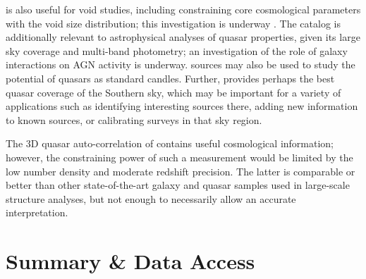 \cat is also useful for void studies, including constraining core cosmological parameters with the void size distribution; this investigation is underway \citep{quaia-voids}.
The catalog is additionally relevant to astrophysical analyses of quasar properties, given its large sky coverage and multi-band photometry; an investigation of the role of galaxy interactions on AGN activity is underway.
\cat sources may also be used to study the potential of quasars as standard candles.
Further, \cat provides perhaps the best quasar coverage of the Southern sky, which may be important for a variety of applications such as identifying interesting sources there, adding new information to known sources, or calibrating surveys in that sky region.

The 3D quasar auto-correlation of \cat contains useful cosmological information; however, the constraining power of such a measurement would be limited by the low number density and moderate redshift precision. 
The latter is comparable or better than other state-of-the-art galaxy and quasar samples used in large-scale structure analyses, but not enough to necessarily allow an accurate interpretation.


\section{Summary \& Data Access}
\label{sec:summary}

